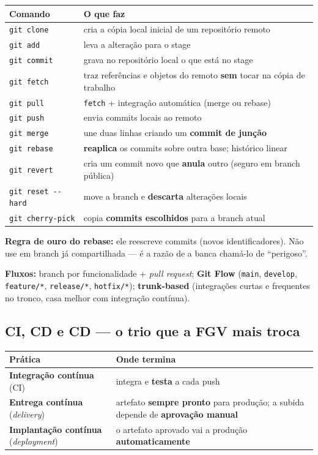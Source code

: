 \begin{center}
\begin{tabular}{@{}p{2.8cm}p{8.4cm}@{}}
\toprule
\textbf{Comando} & \textbf{O que faz} \\
\midrule
\texttt{git clone} & cria a cópia local inicial de um repositório remoto \\
\texttt{git add} & leva a alteração para o stage \\
\texttt{git commit} & grava no repositório local o que está no stage \\
\texttt{git fetch} & traz referências e objetos do remoto \textbf{sem} tocar na cópia de trabalho \\
\texttt{git pull} & \texttt{fetch} + integração automática (merge ou rebase) \\
\texttt{git push} & envia commits locais ao remoto \\
\texttt{git merge} & une duas linhas criando um \textbf{commit de junção} \\
\texttt{git rebase} & \textbf{reaplica} os commits sobre outra base; histórico linear \\
\texttt{git revert} & cria um commit novo que \textbf{anula} outro (seguro em branch pública) \\
\texttt{git reset -{}-hard} & move a branch e \textbf{descarta} alterações locais \\
\texttt{git cherry-pick} & copia \textbf{commits escolhidos} para a branch atual \\
\bottomrule
\end{tabular}
\end{center}

\textbf{Regra de ouro do rebase:} ele reescreve commits (novos
identificadores). Não use em branch já compartilhada --- é a razão de a banca
chamá-lo de ``perigoso''.

\textbf{Fluxos:} branch por funcionalidade + \textit{pull request};
\textbf{Git Flow} (\texttt{main}, \texttt{develop}, \texttt{feature/*},
\texttt{release/*}, \texttt{hotfix/*}); \textbf{trunk-based} (integrações
curtas e frequentes no tronco, casa melhor com integração contínua).

\subsection{CI, CD e CD --- o trio que a FGV mais troca}

\begin{center}
\begin{tabular}{@{}p{4.4cm}p{6.8cm}@{}}
\toprule
\textbf{Prática} & \textbf{Onde termina} \\
\midrule
\textbf{Integração contínua} (CI) & integra e \textbf{testa} a cada push \\
\textbf{Entrega contínua} (\textit{delivery}) & artefato \textbf{sempre pronto} para produção; a subida depende de \textbf{aprovação manual} \\
\textbf{Implantação contínua} (\textit{deployment}) & o artefato aprovado vai a produção \textbf{automaticamente} \\
\bottomrule
\end{tabular}
\end{center}

